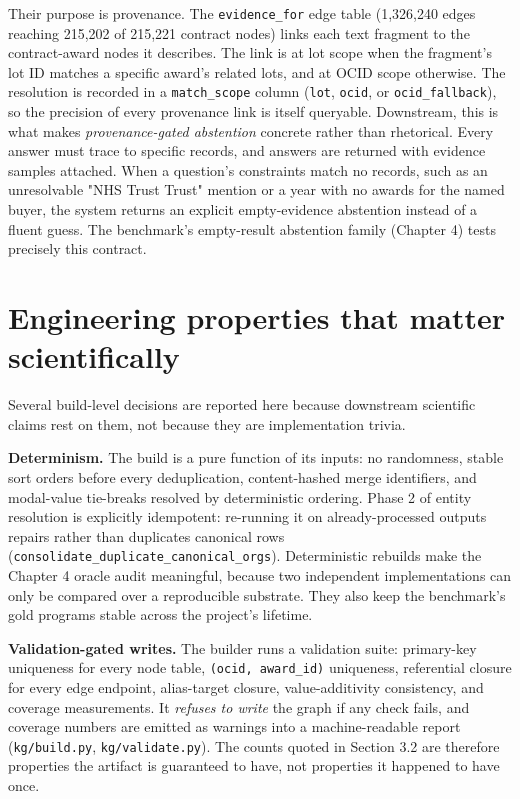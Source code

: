 \documentclass[10pt]{article} %
\begin{document}
Their purpose is provenance. The \texttt{evidence\_for} edge table (1,326,240 edges reaching 215,202 of 215,221 contract nodes) links each text fragment to the contract-award nodes it describes. The link is at lot scope when the fragment's lot ID matches a specific award's related lots, and at OCID scope otherwise. The resolution is recorded in a \texttt{match\_scope} column (\texttt{lot}, \texttt{ocid}, or \texttt{ocid\_fallback}), so the precision of every provenance link is itself queryable. Downstream, this is what makes \emph{provenance-gated abstention} concrete rather than rhetorical. Every answer must trace to specific records, and answers are returned with evidence samples attached. When a question's constraints match no records, such as an unresolvable "NHS Trust Trust" mention or a year with no awards for the named buyer, the system returns an explicit empty-evidence abstention instead of a fluent guess. The benchmark's empty-result abstention family (Chapter 4) tests precisely this contract.

\section{Engineering properties that matter scientifically}\label{sec:engineering-properties-that-matter-scien}

Several build-level decisions are reported here because downstream scientific claims rest on them, not because they are implementation trivia.

\textbf{Determinism.} The build is a pure function of its inputs: no randomness, stable sort orders before every deduplication, content-hashed merge identifiers, and modal-value tie-breaks resolved by deterministic ordering. Phase 2 of entity resolution is explicitly idempotent: re-running it on already-processed outputs repairs rather than duplicates canonical rows (\texttt{consolidate\_duplicate\_canonical\_orgs}). Deterministic rebuilds make the Chapter 4 oracle audit meaningful, because two independent implementations can only be compared over a reproducible substrate. They also keep the benchmark's gold programs stable across the project's lifetime.

\textbf{Validation-gated writes.} The builder runs a validation suite: primary-key uniqueness for every node table, \texttt{(ocid, award\_id)} uniqueness, referential closure for every edge endpoint, alias-target closure, value-additivity consistency, and coverage measurements. It \emph{refuses to write} the graph if any check fails, and coverage numbers are emitted as warnings into a machine-readable report (\texttt{kg/build.py}, \texttt{kg/validate.py}). The counts quoted in Section 3.2 are therefore properties the artifact is guaranteed to have, not properties it happened to have once.
\end{document}
